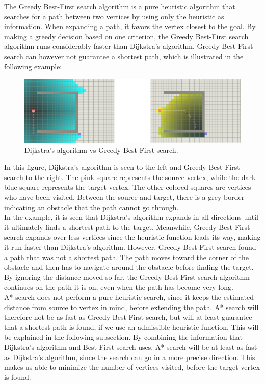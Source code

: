 \documentclass[11pt]{article}
\begin{document}
\noindent The Greedy Best-First search algorithm is a pure heuristic algorithm that searches for a path between two vertices by using only the heuristic as information. When expanding a path, it favors the vertex closest to the goal. By making a greedy decision based on one criterion, the Greedy Best-First search algorithm runs considerably faster than Dijkstra's algorithm. Greedy Best-First search can however not guarantee a shortest path, which is illustrated in the following example:

\begin{figure}[H]
\centering
\includegraphics[scale=0.45]{Pictures/Comparison1.png}
\caption[]{Dijkstra's algorithm  vs  Greedy Best-First search.\footnotemark}
\end{figure}

\noindent In this figure, Dijkstra's algorithm is seen to the left and Greedy Best-First search to the right. The pink square represents the source vertex, while the dark blue square represents the target vertex. The other colored squares are vertices who have been visited. Between the source and target, there is a grey border indicating an obstacle that the path cannot go through.\\ 

\noindent In the example, it is seen that Dijkstra's algorithm expands in all directions until it ultimately finds a shortest path to the target. Meanwhile, Greedy Best-First search expands over less vertices since the heuristic function leads its way, making it run faster than Dijkstra's algorithm. However, Greedy Best-First search found a path that was not a shortest path. The path moves toward the corner of the obstacle and then has to navigate around the obstacle before finding the target. By ignoring the distance moved so far, the Greedy Best-First search algorithm continues on the path it is on, even when the path has become very long.\\

\noindent A* search does not perform a pure heuristic search, since it keeps the estimated distance from source to vertex in mind, before extending the path. A* search will therefore not be as fast as Greedy Best-First search, but will at least guarantee that a shortest path is found, if we use an admissible heuristic function. This will be explained in the following subsection. By combining the information that Dijkstra's algorithm and Best-First search uses, A* search will be at least as fast as Dijkstra's algorithm, since the search can go in a more precise direction. This makes us able to minimize the number of vertices visited, before the target vertex is found. \\
\end{document}
